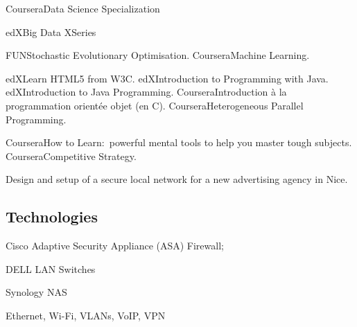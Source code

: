    {Coursera}{Data Science Specialization}


   {edX}{Big Data XSeries}

   {FUN}{Stochastic Evolutionary Optimisation.}
   {Coursera}{Machine Learning.}

   
   {edX}{Learn HTML5 from W3C.}
   {edX}{Introduction to Programming with Java.}
   {edX}{Introduction to Java Programming.}
   {Coursera}{Introduction \`a la programmation orient\'ee objet (en C\plusplus).}
   {Coursera}{Heterogeneous Parallel Programming.}


   {Coursera}{How to Learn:~powerful mental tools to help you master tough subjects.}
   {Coursera}{Competitive Strategy.}


\bigskip
{}
Design and setup of a secure local network for a new advertising agency in Nice.

\subsection{Technologies}

\item{\bdot} Cisco Adaptive Security Appliance (ASA) Firewall;
\item{\bdot} DELL LAN Switches
\item{\bdot} Synology NAS
\item{\bdot} Ethernet, Wi-Fi, VLANs, VoIP, VPN

